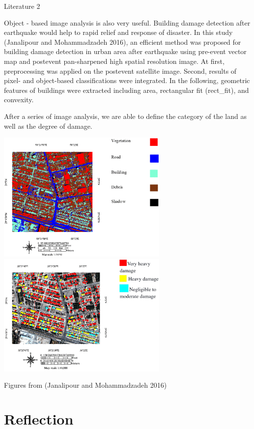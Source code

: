 \documentclass[
  letterpaper,
  DIV=11,
  numbers=noendperiod]{scrreprt}
\begin{document}
Literature 2

Object - based image analysis is also very useful. Building damage
detection after earthquake would help to rapid relief and response of
disaster. In this study (Janalipour and Mohammadzadeh 2016), an
efficient method was proposed for building damage detection in urban
area after earthquake using pre-event vector map and postevent
pan-sharpened high spatial resolution image. At first, preprocessing was
applied on the postevent satellite image. Second, results of pixel- and
object-based classifications were integrated. In the following,
geometric features of buildings were extracted including area,
rectangular fit (rect\_fit), and convexity.~

After a series of image analysis, we are able to define the category of
the land as well as the degree of damage.

\includegraphics[width=3.29167in,height=\textheight]{OBIA.png}\includegraphics[width=3.29167in,height=\textheight]{OBIA_b.png}

Figures from (Janalipour and Mohammadzadeh 2016)


\chapter{Reflection}\label{reflection-4}
\end{document}
